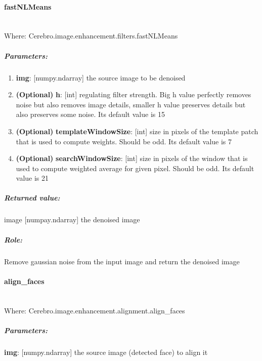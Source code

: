 \paragraph{fastNLMeans} \mbox{} \\
Where: Cerebro.image.enhancement.filters.fastNLMeans
\subparagraph{Parameters:}
\begin{changemargin}{0.5cm}{0cm}
	\begin{enumerate} 
		\item \textbf{img}: [numpy.ndarray] the source image to be denoised
		\item \textbf{(Optional)} \textbf{h}: [int] regulating filter strength. Big h value perfectly removes noise but also removes image details, smaller h value preserves details but also preserves some noise. Its default value is 15
		\item \textbf{(Optional)} \textbf{templateWindowSize}: [int] size in pixels of the template patch that is used to compute weights. Should be odd. Its default value is 7
		\item \textbf{(Optional)} \textbf{searchWindowSize}: [int] size in pixels of the window that is used to compute weighted average for given pixel. Should be odd. Its default value is 21
	\end{enumerate}
\end{changemargin}

\subparagraph{Returned value:}
\begin{changemargin}{1cm}{0cm}
	image [numpay.ndarray] the denoised image
\end{changemargin}

\subparagraph{Role:}
\begin{changemargin}{1cm}{0cm}
	Remove gaussian noise from the input image and return the denoised image
\end{changemargin}


\paragraph{align\_faces} \mbox{} \\
Where: Cerebro.image.enhancement.alignment.align\_faces
\subparagraph{Parameters:}
\begin{changemargin}{1cm}{0cm}
	\textbf{img}: [numpy.ndarray] the source image (detected face) to align it
\end{changemargin}

